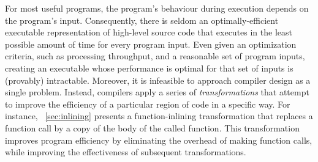 


For most useful programs, the program's behaviour during execution depends on the program's input.
Consequently, there is seldom an optimally-efficient executable
representation of high-level source code that executes
in the least possible amount of time for every program input.  Even
given an optimization criteria, such as processing throughput, and a
reasonable set of program inputs, creating an executable whose
performance is optimal for that set of inputs is (provably)
intractable. Moreover, it is infeasible to approach compiler design as
a single problem.  Instead, compilers apply a series of {\it
transformations} that attempt to improve
the efficiency of a particular region of code in a specific way.  For
instance, ~\ref{sec:inlining} presents a function-inlining
transformation that replaces a function call by a copy of the body of
the called function. This transformation improves program efficiency
by eliminating the overhead of making function calls, while improving
the effectiveness of subsequent transformations.

